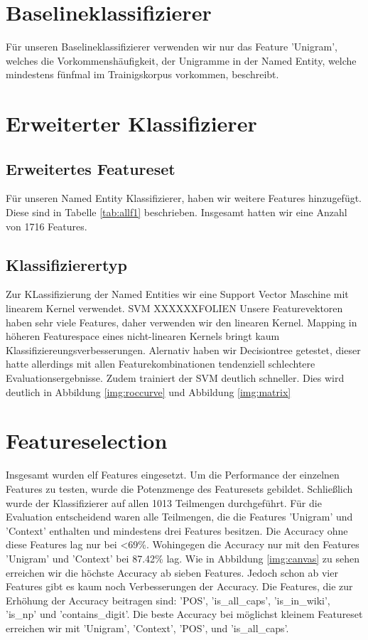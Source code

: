 \documentclass[a4paper, 11pt]{article}
\begin{document}
\section{Baselineklassifizierer}
Für unseren Baselineklassifizierer verwenden wir nur das Feature 'Unigram', welches die Vorkommenshäufigkeit, der Unigramme in der Named Entity, welche mindestens fünfmal im Trainigskorpus vorkommen, beschreibt.
\section{Erweiterter Klassifizierer}
\subsection{Erweitertes Featureset}
Für unseren Named Entity Klassifizierer, haben wir weitere Features hinzugefügt. Diese sind in Tabelle \ref{tab:allf1} beschrieben. Insgesamt hatten wir eine Anzahl von 1716 Features.
\subsection{Klassifizierertyp}
Zur KLassifizierung der Named Entities wir eine Support Vector Maschine mit linearem Kernel verwendet. SVM XXXXXXFOLIEN
Unsere Featurevektoren haben sehr viele Features, daher verwenden wir den linearen Kernel. Mapping in höheren Featurespace eines nicht-linearen Kernels bringt kaum Klassifiziereungsverbesserungen. Alernativ haben wir Decisiontree getestet, dieser hatte allerdings mit allen Featurekombinationen tendenziell schlechtere Evaluationsergebnisse. Zudem trainiert der SVM deutlich schneller. Dies wird deutlich in Abbildung \ref{img:roccurve} und Abbildung \ref{img:matrix}
\section{Featureselection}
Insgesamt wurden elf Features eingesetzt. Um die Performance der einzelnen Features zu testen, wurde die Potenzmenge des Featuresets gebildet. Schließlich wurde der Klassifizierer auf allen 1013 Teilmengen durchgeführt. Für die Evaluation entscheidend waren alle Teilmengen, die die Features 'Unigram' und 'Context' enthalten und mindestens drei Features besitzen. Die Accuracy ohne diese Features lag nur bei <69\%. Wohingegen die Accuracy nur mit den Features 'Unigram' und 'Context' bei 87.42\% lag. Wie in Abbildung \ref{img:canvas} zu sehen erreichen wir die höchste Accuracy ab sieben Features. Jedoch schon ab vier Features gibt es kaum noch Verbesserungen der Accuracy. Die Features, die zur Erhöhung der Accuracy beitragen sind: 'POS', 'is_all_caps', 'is_in_wiki', 'is_np' und 'contains_digit'. Die beste Accuracy bei möglichst kleinem Featureset erreichen wir mit 'Unigram', 'Context', 'POS', und 'is_all_caps'.
\end{document}
